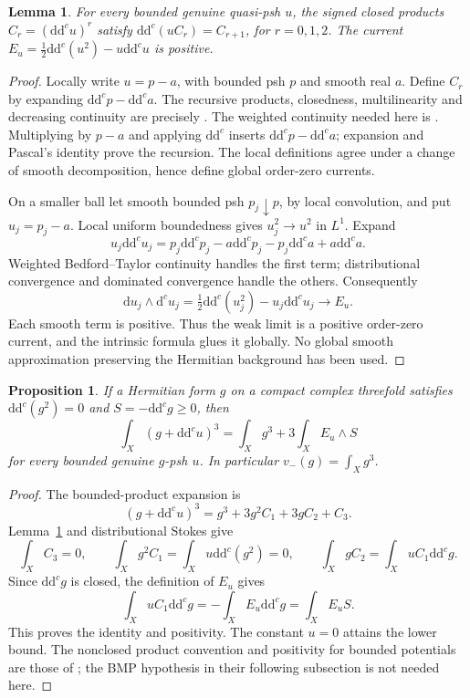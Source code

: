 \documentclass[11pt]{article}
\newtheorem{lemma}[theorem]{Lemma}
\newtheorem{proposition}[theorem]{Proposition}
\newcommand{\ddc}{\mathrm d\mathrm d^c}
\begin{document}
\begin{lemma}\label{lem:energy}
For every bounded genuine quasi-psh \(u\), the signed closed products
\(C_r=(\ddc u)^r\) satisfy
\(\ddc(u C_r)=C_{r+1}\), for \(r=0,1,2\).
The current \(E_u=\frac12\ddc(u^2)-u\ddc u\) is positive.
\end{lemma}
\begin{proof}
Locally write \(u=p-a\), with bounded psh \(p\) and smooth real \(a\).
Define \(C_r\) by expanding \(\ddc p-\ddc a\).
The recursive products, closedness, multilinearity and decreasing
continuity are precisely \cite[(2.1), Theorem 2.1, Corollary 2.2]{BT}.
The weighted continuity needed here is
\cite[Theorem 2.4]{BT}. Multiplying by \(p-a\) and applying \(\ddc\)
inserts \(\ddc p-\ddc a\); expansion and Pascal's identity prove the
recursion. The local definitions agree under a change of smooth
decomposition, hence define global order-zero currents.

On a smaller ball let smooth bounded psh \(p_j\downarrow p\), by local
convolution, and put \(u_j=p_j-a\). Local uniform boundedness gives
\(u_j^2\to u^2\) in \(L^1\). Expand
\[
 u_j\ddc u_j
 =p_j\ddc p_j-a\ddc p_j-p_j\ddc a+a\ddc a.
\]
Weighted Bedford--Taylor continuity handles the first term;
distributional convergence and dominated convergence handle the others.
Consequently
\[
 \mathrm du_j\wedge\mathrm d^c u_j
 =\tfrac12\ddc(u_j^2)-u_j\ddc u_j\longrightarrow E_u.
\]
Each smooth term is positive. Thus the weak limit is a positive
order-zero current, and the intrinsic formula glues it globally.
No global smooth approximation preserving the Hermitian background
has been used.
\end{proof}

\begin{proposition}\label{prop:cubic}
If a Hermitian form \(g\) on a compact complex threefold satisfies
\(\ddc(g^2)=0\) and \(S=-\ddc g\ge0\), then
\[
 \int_X(g+\ddc u)^3=\int_Xg^3+3\int_XE_u\wedge S
\]
for every bounded genuine \(g\)-psh \(u\). In particular
\(v_-(g)=\int_Xg^3\).
\end{proposition}
\begin{proof}
The bounded-product expansion is
\[
 (g+\ddc u)^3=g^3+3g^2 C_1+3g C_2+C_3.
\]
Lemma~\ref{lem:energy} and distributional Stokes give
\[
 \int_X C_3=0,\qquad
 \int_X g^2 C_1=\int_Xu\ddc(g^2)=0,\qquad
 \int_X g C_2=\int_Xu C_1\ddc g.
\]
Since \(\ddc g\) is closed, the definition of \(E_u\) gives
\[
 \int_X u C_1\ddc g=-\int_XE_u\ddc g=\int_XE_u S.
\]
This proves the identity and positivity. The constant \(u=0\) attains
the lower bound. The nonclosed product convention and positivity for
bounded potentials are those of \cite[Section 2.1, Proposition 2.1]{BGL};
the BMP hypothesis in their following subsection is not needed here.
\end{proof}
\end{document}
